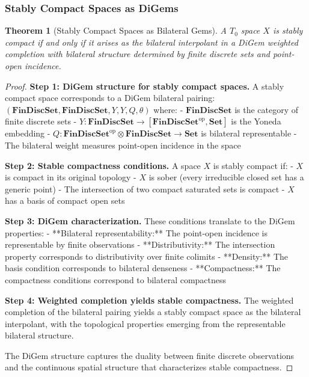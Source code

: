 \documentclass[11pt]{article}
\theoremstyle{plain}
\newtheorem{theorem}{Theorem}[section]
\theoremstyle{definition}
\theoremstyle{remark}
\newcommand{\op}{\mathrm{op}}
\begin{document}
\subsubsection{Stably Compact Spaces as DiGems}

\begin{theorem}[Stably Compact Spaces as Bilateral Gems]\label{thm:stably-compact-digems}
A $T_0$ space $X$ is stably compact if and only if it arises as the bilateral interpolant in a DiGem weighted completion with bilateral structure determined by finite discrete sets and point-open incidence.
\end{theorem}

\begin{proof}
\textbf{Step 1: DiGem structure for stably compact spaces.}
A stably compact space corresponds to a DiGem bilateral pairing:
$(\mathbf{FinDiscSet}, \mathbf{FinDiscSet}, Y, Y, Q, \theta)$ where:
- $\mathbf{FinDiscSet}$ is the category of finite discrete sets
- $Y : \mathbf{FinDiscSet} \to [\mathbf{FinDiscSet}^{\op}, \mathbf{Set}]$ is the Yoneda embedding  
- $Q : \mathbf{FinDiscSet}^{\op} \otimes \mathbf{FinDiscSet} \to \mathbf{Set}$ is bilateral representable
- The bilateral weight measures point-open incidence in the space

\textbf{Step 2: Stable compactness conditions.}
A space $X$ is stably compact if:
- $X$ is compact in its original topology
- $X$ is sober (every irreducible closed set has a generic point)  
- The intersection of two compact saturated sets is compact
- $X$ has a basis of compact open sets

\textbf{Step 3: DiGem characterization.}
These conditions translate to the DiGem properties:
- **Bilateral representability:** The point-open incidence is representable by finite observations
- **Distributivity:** The intersection property corresponds to distributivity over finite colimits
- **Density:** The basis condition corresponds to bilateral denseness
- **Compactness:** The compactness conditions correspond to bilateral compactness

\textbf{Step 4: Weighted completion yields stable compactness.}
The weighted completion of the bilateral pairing yields a stably compact space as the bilateral interpolant, with the topological properties emerging from the representable bilateral structure.

The DiGem structure captures the duality between finite discrete observations and the continuous spatial structure that characterizes stable compactness.
\end{proof}
\end{document}
